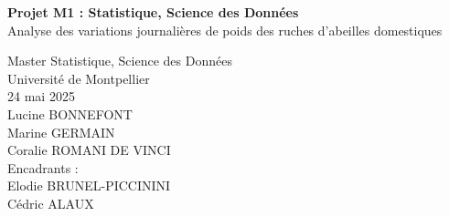 \documentclass[a4paper,12pt]{article}
\begin{document}
\begin{titlepage}

    \thispagestyle{fancy}
    \fancyhf{}
    \renewcommand{\headrulewidth}{0pt} 

 \centering
 \vspace*{1.5cm} 

    \begin{center} %
        \Huge{\textbf{Projet M1 : Statistique, Science des Données}}\\
        \Huge{Analyse des variations journalières de poids des ruches d’abeilles domestiques }
    \end{center}
 
 \vspace{5cm}
 
 \Large{Master Statistique, Science des Données}\\[0.5cm]
 \Large{Université de Montpellier}\\[0.5cm]
 \Large{24 mai 2025} \\[1.5cm]

 \Large{Lucine BONNEFONT}\\
 \Large{{Marine GERMAIN}}\\
 \Large{{Coralie ROMANI DE VINCI}}\\[1.5cm]
 \Large{Encadrants :}\\
 \Large{Elodie BRUNEL-PICCININI}\\
 \Large{{Cédric ALAUX}}\\
 
\end{titlepage}
\pagestyle{plain}

\renewcommand{\contentsname}{Table des matières}
\tableofcontents

\newpage
\end{document}
